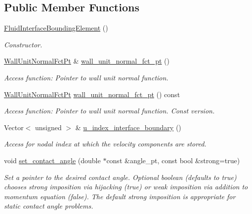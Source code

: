 \subsection*{Public Member Functions}
\begin{DoxyCompactItemize}
\item 
\hyperlink{classoomph_1_1FluidInterfaceBoundingElement_ab47dc01b830d4c405002e61a7205ca7c}{Fluid\+Interface\+Bounding\+Element} ()
\begin{DoxyCompactList}\small\item\em Constructor. \end{DoxyCompactList}\item 
\hyperlink{classoomph_1_1FluidInterfaceBoundingElement_a09c0b1df7d653eaf55e94e3951d409dd}{Wall\+Unit\+Normal\+Fct\+Pt} \& \hyperlink{classoomph_1_1FluidInterfaceBoundingElement_a3d8ea7b8e1f22eaaa1235231454b753c}{wall\+\_\+unit\+\_\+normal\+\_\+fct\+\_\+pt} ()
\begin{DoxyCompactList}\small\item\em Access function\+: Pointer to wall unit normal function. \end{DoxyCompactList}\item 
\hyperlink{classoomph_1_1FluidInterfaceBoundingElement_a09c0b1df7d653eaf55e94e3951d409dd}{Wall\+Unit\+Normal\+Fct\+Pt} \hyperlink{classoomph_1_1FluidInterfaceBoundingElement_a393601b322d0b8d6d2f86d07bd17550f}{wall\+\_\+unit\+\_\+normal\+\_\+fct\+\_\+pt} () const
\begin{DoxyCompactList}\small\item\em Access function\+: Pointer to wall unit normal function. Const version. \end{DoxyCompactList}\item 
Vector$<$ unsigned $>$ \& \hyperlink{classoomph_1_1FluidInterfaceBoundingElement_ad74aadb79a88536e188fbff44f35cc02}{u\+\_\+index\+\_\+interface\+\_\+boundary} ()
\begin{DoxyCompactList}\small\item\em Access for nodal index at which the velocity components are stored. \end{DoxyCompactList}\item 
void \hyperlink{classoomph_1_1FluidInterfaceBoundingElement_a8566c5bed5c87717fcb155d398ed8c8f}{set\+\_\+contact\+\_\+angle} (double $\ast$const \&angle\+\_\+pt, const bool \&strong=true)
\begin{DoxyCompactList}\small\item\em Set a pointer to the desired contact angle. Optional boolean (defaults to true) chooses strong imposition via hijacking (true) or weak imposition via addition to momentum equation (false). The default strong imposition is appropriate for static contact angle problems. \end{DoxyCompactList}\item 

\end{DoxyCompactItemize}
